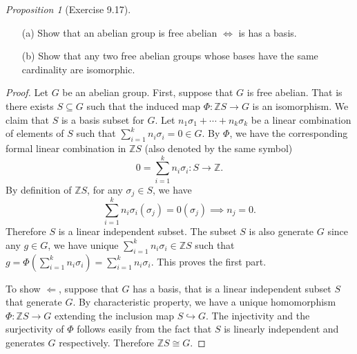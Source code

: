 \documentclass[a4paper]{article}
\theoremstyle{remark}
\newtheorem{prop}{Proposition}
\newcommand{\Z}{\mathbb{Z}} %
\newcommand{\subhim}{\subseteq} %
\begin{document}
\begin{prop}[Exercise 9.17]
	\begin{itemize}[nolistsep]
		\item [(a)] Show that an abelian group is free abelian $\Leftrightarrow$ is has a basis.
		\item [(b)] Show that any two free abelian groups whose bases have the same cardinality are isomorphic.
	\end{itemize}
\end{prop}
\begin{proof}
	Let $G$ be an abelian group. First, suppose that $G$ is free abelian. That is there exists $S\subhim G$ such that the induced map $\Phi : \Z S \to G$ is an isomorphism. We claim that $S$ is a basis subset for $G$. Let $n_1\sigma_1 + \cdots+ n_k \sigma_k$ be a linear combination of elements of $S$ such that $\sum_{i=1}^{k}n_i\sigma_i = 0 \in G$. By $\Phi$, we have the corresponding formal linear combination in $\Z S$ (also denoted by the same symbol) 
	$$
	0=\sum_{i=1}^{k}n_i\sigma_i : S \to \Z.
	$$
	By definition of $\Z S$, for any $\sigma_j \in S$, we have 
	$$ 
	\sum_{i=1}^{k}n_i\sigma_i(\sigma_j) = 0(\sigma_j) \implies n_j = 0.
	$$
	Therefore $S$ is a linear independent subset. The subset $S$ is also generate $G$ since any $g \in G$, we have unique $\sum_{i=1}^{k}n_i\sigma_i \in \Z S$ such that $g=\Phi(\sum_{i=1}^{k}n_i\sigma_i) = \sum_{i=1}^{k}n_i\sigma_i$. This proves the first part.
	
	To show $\Leftarrow$, suppose that $G$ has a basis, that is a linear independent subset $S$ that generate $G$. By characteristic property, we have a unique homomorphism $\Phi : \Z S \to G$ extending the inclusion map $S \hookrightarrow G$. The injectivity and the surjectivity of $\Phi$ follows easily from the fact that $S$ is linearly independent and generates $G$ respectively. Therefore $\Z S \cong G$.
	

\end{proof}
\end{document}
